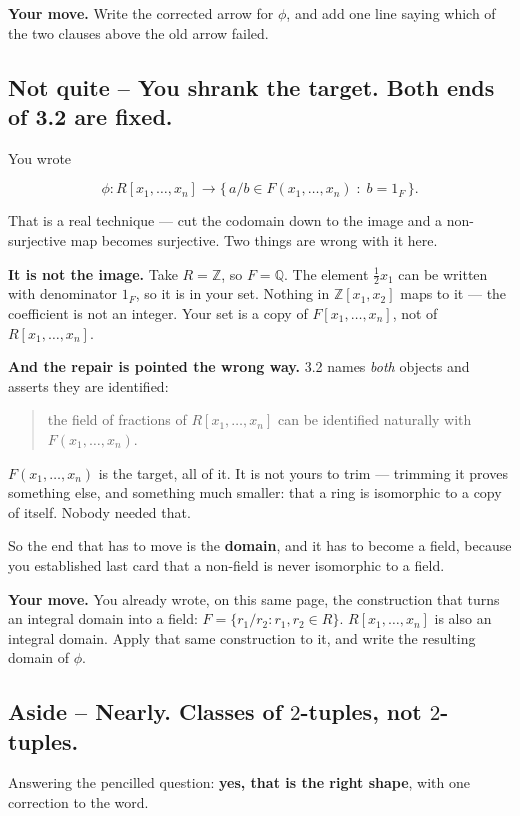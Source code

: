\documentclass[11pt]{article}
\begin{document}
\textbf{Your move.} Write the corrected arrow for $\phi$, and add one line saying which of the two clauses above the old arrow failed.


\subsection*{Not quite -- You shrank the target. Both ends of 3.2 are fixed.}
You wrote

$$\phi : R[x_1,\ldots,x_n] \longrightarrow \{\, a/b \in F(x_1,\ldots,x_n) \;:\; b = 1_F \,\}.$$

That is a real technique --- cut the codomain down to the image and a non-surjective map becomes surjective. Two things are wrong with it here.

\textbf{It is not the image.} Take $R = \mathbb{Z}$, so $F = \mathbb{Q}$. The element $\tfrac{1}{2}x_1$ can be written with denominator $1_F$, so it is in your set. Nothing in $\mathbb{Z}[x_1,x_2]$ maps to it --- the coefficient is not an integer. Your set is a copy of $F[x_1,\ldots,x_n]$, not of $R[x_1,\ldots,x_n]$.

\textbf{And the repair is pointed the wrong way.} 3.2 names \emph{both} objects and asserts they are identified:

\begin{quote}
the field of fractions of $R[x_1,\ldots,x_n]$ can be identified naturally with $F(x_1,\ldots,x_n)$.
\end{quote}

$F(x_1,\ldots,x_n)$ is the target, all of it. It is not yours to trim --- trimming it proves something else, and something much smaller: that a ring is isomorphic to a copy of itself. Nobody needed that.

So the end that has to move is the \textbf{domain}, and it has to become a field, because you established last card that a non-field is never isomorphic to a field.

\textbf{Your move.} You already wrote, on this same page, the construction that turns an integral domain into a field: $F = \{r_1/r_2 : r_1, r_2 \in R\}$. $R[x_1,\ldots,x_n]$ is also an integral domain. Apply that same construction to it, and write the resulting domain of $\phi$.


\subsection*{Aside -- Nearly. Classes of $2$-tuples, not $2$-tuples.}
Answering the pencilled question: \textbf{yes, that is the right shape}, with one correction to the word.
\end{document}
